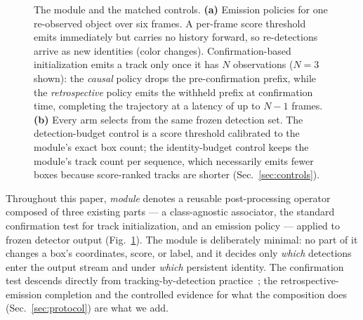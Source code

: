 \begin{figure}[t]
{}
\caption{The module and the matched controls. \textbf{(a)} Emission policies
for one re-observed object over six frames. A per-frame score threshold emits
immediately but carries no history forward, so re-detections arrive as new
identities (color changes). Confirmation-based initialization emits a track
only once it has $N$ observations ($N{=}3$ shown): the \emph{causal} policy
drops the pre-confirmation prefix, while the \emph{retrospective} policy
emits the withheld prefix at confirmation time, completing the trajectory at
a latency of up to $N{-}1$ frames. \textbf{(b)} Every arm selects from the
same frozen detection set. The detection-budget control is a score threshold
calibrated to the module's exact box count; the identity-budget control keeps
the module's track count per sequence, which necessarily emits fewer boxes
because score-ranked tracks are shorter (Sec.~\ref{sec:controls}).}
\label{fig:overview}
\end{figure}

Throughout this paper, \emph{module} denotes a reusable post-processing
operator composed of three existing parts --- a class-agnostic associator, the
standard confirmation test for track initialization, and an emission policy
--- applied to frozen detector output (Fig.~\ref{fig:overview}). The module is deliberately minimal:
no part of it changes a box's coordinates, score, or label, and it decides
only \emph{which} detections enter the output stream and under \emph{which}
persistent identity. The confirmation test descends directly from
tracking-by-detection practice~\cite{sort,deepsort,ab3dmot}; the
retrospective-emission completion and the controlled evidence for what the
composition does (Sec.~\ref{sec:protocol}) are what we add.

